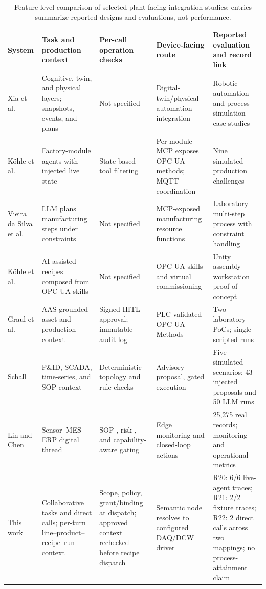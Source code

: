 \begin{table}[!t]
\centering
\caption{Feature-level comparison of selected plant-facing integration
studies; entries summarize reported designs and evaluations, not performance.}
\label{tab:nearest}
\small
\setlength{\tabcolsep}{3pt}
\begin{tabularx}{\textwidth}{@{}p{1.8cm}p{3.0cm}p{2.4cm}p{2.8cm}X@{}}
\toprule
System & Task and production context & Per-call operation checks & Device-facing route & Reported evaluation and record link \\
\midrule
Xia et al. \cite{xia2025architecture} & Cognitive, twin, and physical layers; snapshots, events, and plans & Not specified & Digital-twin/physical-automation integration & Robotic automation and process-simulation case studies \\
K{\"o}hle et al. \cite{koehle2026llmdriven} & Factory-module agents with injected live state & State-based tool filtering & Per-module MCP exposes OPC UA methods; MQTT coordination & Nine simulated production challenges \\
Vieira da Silva et al. \cite{silva2025mcpmanufacturing} & LLM plans manufacturing steps under constraints & Not specified & MCP-exposed manufacturing resource functions & Laboratory multi-step process with constraint handling \\
K{\"o}hle et al. \cite{koehle2025semanticrecipes} & AI-assisted recipes composed from OPC UA skills & Not specified & OPC UA skills and virtual commissioning & Unity assembly-workstation proof of concept \\
Graul et al. \cite{graul2026aas} & AAS-grounded asset and production context & Signed HITL approval; immutable audit log & PLC-validated OPC UA Methods & Two laboratory PoCs; single scripted runs \\
Schall \cite{schall2026safe} & P\&ID, SCADA, time-series, and SOP context & Deterministic topology and rule checks & Advisory proposal, gated execution & Five simulated scenarios; 43 injected proposals and 50 LLM runs \\
Lin and Chen \cite{lin2026agentic} & Sensor--MES--ERP digital thread & SOP-, risk-, and capability-aware gating & Edge monitoring and closed-loop actions & 25,275 real records; monitoring and operational metrics \\
\midrule
This work & Collaborative tasks and direct calls; per-turn line--product--recipe--run context & Scope, policy, grant/binding at dispatch; approved context rechecked before recipe dispatch & Semantic node resolves to configured DAQ/DCW driver & R20: 6/6 live-agent traces; R21: 2/2 fixture traces; R22: 2 direct calls across two mappings; no process-attainment claim \\
\bottomrule
\end{tabularx}
\end{table}


